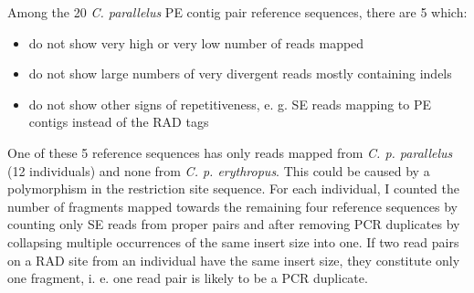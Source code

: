 \documentclass[a4paper,12pt,times,authoryear,twoside,print,index]{Classes/PhDThesisPSnPDF}\usepackage[]{graphicx}\usepackage[]{color}
\begin{document}
Among the 20 \textit{C. parallelus} PE contig pair reference sequences, there are 5 which:

\begin{itemize}
\item do not show very high or very low number of reads mapped
\item do not show large numbers of very divergent reads mostly containing \glspl{indel}
\item do not show other signs of repetitiveness, e. g. SE reads mapping to PE contigs instead of the \glspl{RAD tag}
\end{itemize}

One of these 5 reference sequences has only reads mapped from \textit{C. p. parallelus} (12 individuals) and none from \textit{C. p. erythropus}. This could be caused by a polymorphism in the restriction site sequence. For each individual, I counted the number of \glspl{fragment} mapped towards the remaining four reference sequences by counting only SE reads from \glspl{proper pair} and after removing PCR duplicates by collapsing multiple occurrences of the same insert size into one. If two read pairs on a RAD site from an individual have the same insert size, they constitute only one fragment, i. e. one read pair is likely to be a PCR duplicate. 
\end{document}
